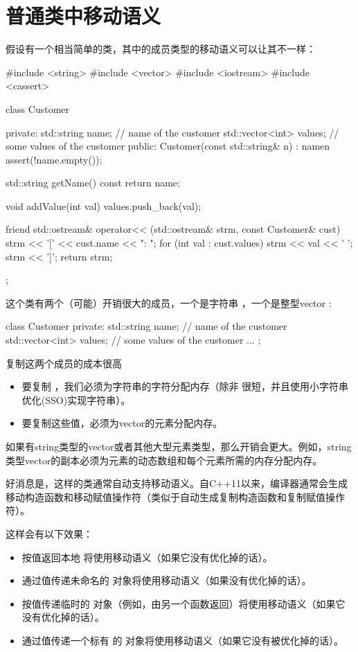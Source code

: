 \section{普通类中移动语义}
假设有一个相当简单的类，其中的成员类型的移动语义可以让其不一样：

\begin{cppcode}
#include <string>
#include <vector>
#include <iostream>
#include <cassert>

class Customer {
private:
	std::string name; // name of the customer
	std::vector<int> values; // some values of the customer
public:
	Customer(const std::string& n)
	: name{n} {
		assert(!name.empty());
	}

	std::string getName() const {
		return name;
	}

	void addValue(int val) {
		values.push_back(val);
	}

	friend std::ostream& operator<< (std::ostream& strm, const Customer& cust) {
		strm << '[' << cust.name << ": ";
		for (int val : cust.values) {
			strm << val << ' ';
		}
		strm << ']';
		return strm;
	}
};
\end{cppcode}

这个类有两个（可能）开销很大的成员，一个是字符串 ，一个是整型vector :

\begin{cppcode}
class Customer {
private:
	std::string name; // name of the customer
	std::vector<int> values; // some values of the customer
	...
};
\end{cppcode}

复制这两个成员的成本很高

\begin{itemize}
	\item 要复制 ，我们必须为字符串的字符分配内存（除非  很短，并且使用小字符串优化(SSO)实现字符串）。
	\item 要复制这些值，必须为vector的元素分配内存。
\end{itemize}

如果有string类型的vector或者其他大型元素类型，那么开销会更大。例如，string类型vector的副本必须为元素的动态数组和每个元素所需的内存分配内存。

好消息是，这样的类通常自动支持移动语义。自C++11以来，编译器通常会生成移动构造函数和移动赋值操作符（类似于自动生成复制构造函数和复制赋值操作符）。

这样会有以下效果：

\begin{itemize}
	\item 按值返回本地  将使用移动语义（如果它没有优化掉的话）。
	\item 通过值传递未命名的  对象将使用移动语义（如果没有优化掉的话）。
	\item 按值传递临时的  对象（例如，由另一个函数返回）将使用移动语义（如果它没有优化掉的话）。
	\item 通过值传递一个标有  的  对象将使用移动语义（如果它没有被优化掉的话）。
\end{itemize}

